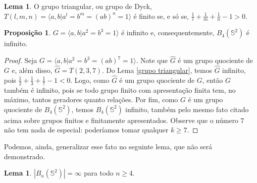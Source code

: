 \documentclass[a4paper,portuguese,11pt,twoside, leqno]{book}
\theoremstyle{definition}
\newtheorem{lemma}[theorem]{Lema}
\newtheorem{prop}{Proposição}[section]
\begin{document}
	\begin{lemma}
		\label{grupo triangular}
		O grupo triangular, ou grupo de Dyck, $T(l,m,n) = \langle a,b|a^l=b^m=(ab)^n=1 \rangle$ é finito se, e só se, $\displaystyle{\frac{1}{l} + \frac{1}{m} + \frac{1}{n} - 1 > 0}$.
	\end{lemma}
	
	
	\begin{prop}
		\label{quociente de B4(S2) infinito}
		$G = \langle a,b|a^2=b^3=1 \rangle$ é infinito e, consequentemente, $B_4(\mathbb{S}^2)$ é infinito.
	\end{prop}
	
	\begin{proof}
		Seja $\widehat{G} = \langle a,b|a^2=b^3=(ab)^7=1 \rangle$. Note que $\widehat{G}$ é um grupo quociente de $G$ e, além disso, $\widehat{G} = T(2,3,7)$. Do Lema \eqref{grupo triangular}, temos $\widehat{G}$ infinito, pois $\displaystyle{\frac{1}{2} + \frac{1}{3} + \frac{1}{7} - 1 < 0}$. Logo, como $\widehat{G}$ é um grupo quociente de $G$, então $G$ também é infinito, pois se todo grupo finito com apresentação finita tem, no máximo, tantos geradores quanto relações. Por fim, como $G$ é um grupo quociente de $B_4(\mathbb{S}^2)$, temos $B_4(\mathbb{S}^2)$ infinito, também pelo mesmo fato citado acima sobre grupos finitos e finitamente apresentados. Observe que o número $7$ não tem nada de especial: poderíamos tomar qualquer $k\geq 7$.
	\end{proof}
	
	\par\vspace{0.3cm} Podemos, ainda, generalizar esse fato no seguinte lema, que não será demonstrado.
	
	\begin{lemma}
		\label{grupo de trancas esfericas infinitos}
		$|B_n(\mathbb{S}^2)| = \infty$ para todo $n\geq 4$.
	\end{lemma}
	
\end{document}
